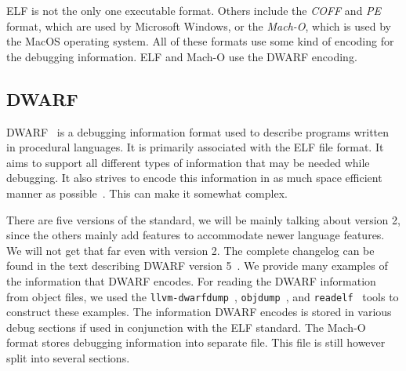 ELF is not the only one executable format. Others include the \textit{COFF} and
\textit{PE} format, which are used by Microsoft Windows, or the
\textit{Mach-O}, which is used by the MacOS operating system. All of these
formats use some kind of encoding for the debugging information. ELF and Mach-O
use the DWARF encoding.

\subsection{DWARF}
DWARF~\cite{dwarf} is a debugging information format used to describe programs
written in procedural languages. It is primarily associated with the ELF file
format. It aims to support all different types of information that may be
needed while debugging. It also strives to encode this information in as much
space efficient manner as possible~\cite{dwarf}. This can make it somewhat
complex. 

There are five versions of the standard, we will be mainly talking about
version 2, since the others mainly add features to accommodate newer language
features. We will not get that far even with version 2. The complete changelog
can be found in the text describing DWARF version 5~\cite{dwarf-5}. We provide
many examples of the information that DWARF encodes. For reading the DWARF
information from object files, we used the
\texttt{llvm-dwarfdump}~\cite{dwarfdump}, \texttt{objdump}~\cite{objdump}, and
\texttt{readelf}~\cite{readelf} tools to construct these examples. The information DWARF encodes is stored in various
debug sections if used in conjunction with the ELF standard. The Mach-O format
stores debugging information into separate file. This file is still however
split into several sections.

